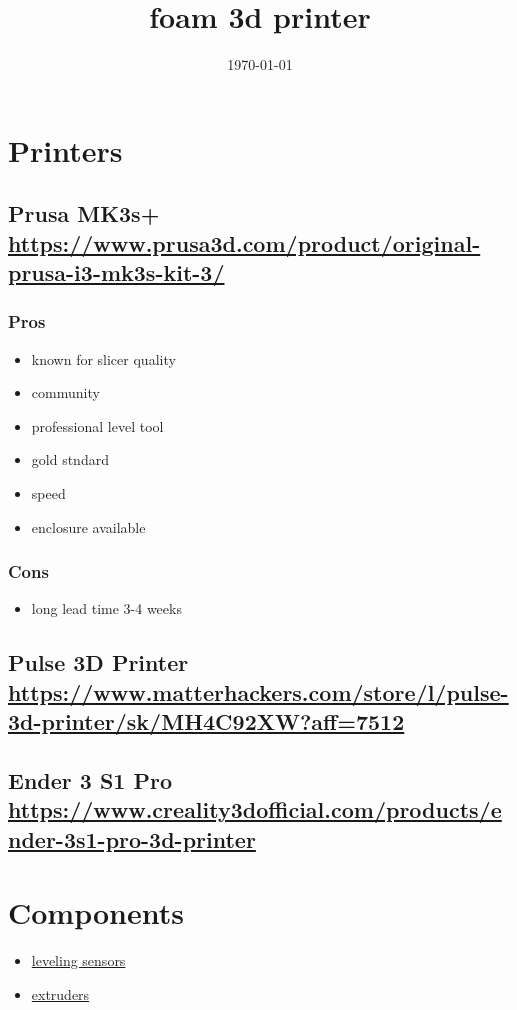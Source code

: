 \documentclass[11pt]{article}
\date{\today}
\title{foam 3d printer}
\begin{document}
\maketitle
\tableofcontents


\section{Printers}
\label{sec:org9a8fd26}
\subsection{Prusa MK3s+ \url{https://www.prusa3d.com/product/original-prusa-i3-mk3s-kit-3/}}
\label{sec:org65525a6}

\subsubsection{Pros}
\label{sec:org4f74527}
\begin{itemize}
\item known for slicer quality
\item community
\item professional level tool
\item gold stndard
\item speed
\item enclosure available
\end{itemize}

\subsubsection{Cons}
\label{sec:orgeae14f9}
\begin{itemize}
\item long lead time 3-4 weeks
\end{itemize}

\subsection{Pulse 3D Printer  \url{https://www.matterhackers.com/store/l/pulse-3d-printer/sk/MH4C92XW?aff=7512}}
\label{sec:orgcd31e7f}
\subsection{Ender 3 S1 Pro \url{https://www.creality3dofficial.com/products/ender-3s1-pro-3d-printer}}
\label{sec:orgde1b792}

\section{Components}
\label{sec:orgfc7c4bd}
\begin{itemize}
\item \href{leveling_sensors.org}{leveling sensors}
\item \href{extruders.org}{extruders}
\end{itemize}
\end{document}
